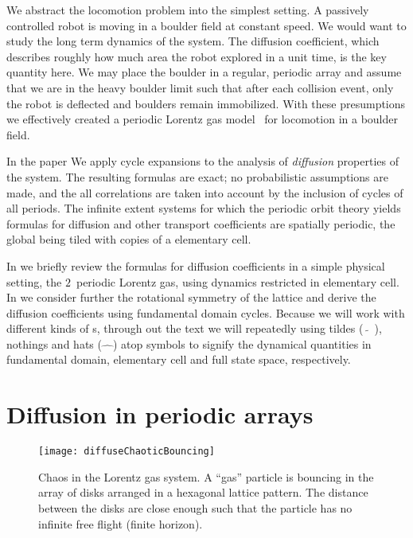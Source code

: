 \documentclass[aps,pre,preprint,groupedaddress,floatfix]{revtex4-1}
\begin{document}
We abstract the locomotion problem into the simplest setting. A passively controlled robot is moving in a boulder field at constant speed. We would want to study the long term dynamics of the system. The diffusion coefficient, which describes roughly how much area the robot explored in a unit time, is the key quantity here. We may place the boulder in a regular, periodic array and assume that we are in the heavy boulder limit such that after each collision event, only the robot is deflected and boulders remain immobilized. With these presumptions we effectively created a periodic Lorentz gas model~\cite{} for locomotion in a boulder field.

In the paper We apply cycle expansions to the analysis of {\em diffusion} properties of the system. The resulting formulas are exact; no probabilistic assumptions are made, and the all correlations are taken into account by the inclusion of cycles of all periods. The infinite extent systems for which the periodic orbit theory yields formulas for diffusion and other transport coefficients are spatially periodic, the global {\statesp} being tiled with copies of a elementary cell.

In  we briefly review the formulas for diffusion coefficients in a simple physical setting, the $2$\dmn\ periodic Lorentz gas, using dynamics restricted in elementary cell. In we consider further the rotational symmetry of the lattice and derive the diffusion coefficients using fundamental domain cycles. Because we will work with different kinds of \statesp s, through out the text we will repeatedly using tildes ($\tilde{\quad}$), nothings and hats ($\hat{\quad}$) atop symbols to signify the dynamical quantities in fundamental domain, elementary cell and full state space, respectively.

\section{Diffusion in periodic arrays}
\label{s-DiffPerArr}

\begin{figure}[htbp]
\begin{center}
\texttt{[image: diffuseChaoticBouncing]}
\end{center}
\caption[]{\label{fig-chaoticBouncing} Chaos in the Lorentz gas system. A ``gas'' particle is bouncing in the array of disks arranged in a hexagonal lattice pattern. The distance between the disks are close enough such that the particle has no infinite free flight (finite horizon). }
\end{figure}
\end{document}
